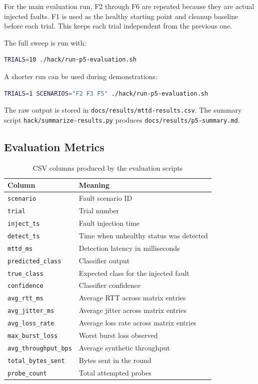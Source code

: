 \documentclass[11pt,a4paper]{article}
\newcommand{\code}[1]{\texttt{#1}}
\begin{document}
For the main evaluation run, F2 through F6 are repeated because they are actual injected faults. F1 is used as the healthy starting point and cleanup baseline before each trial. This keeps each trial independent from the previous one.

The full sweep is run with:

\begin{lstlisting}[language=bash]
TRIALS=10 ./hack/run-p5-evaluation.sh
\end{lstlisting}

A shorter run can be used during demonstrations:

\begin{lstlisting}[language=bash]
TRIALS=1 SCENARIOS="F2 F3 F5" ./hack/run-p5-evaluation.sh
\end{lstlisting}

The raw output is stored in \code{docs/results/mttd-results.csv}. The summary script \code{hack/summarize-results.py} produces \code{docs/results/p5-summary.md}.

\subsection{Evaluation Metrics}

\begin{table}[h]
\centering
\caption{CSV columns produced by the evaluation scripts}
\begin{tabularx}{\textwidth}{@{}lY@{}}
\toprule
\textbf{Column} & \textbf{Meaning} \\
\midrule
\code{scenario} & Fault scenario ID \\
\code{trial} & Trial number \\
\code{inject\_ts} & Fault injection time \\
\code{detect\_ts} & Time when unhealthy status was detected \\
\code{mttd\_ms} & Detection latency in milliseconds \\
\code{predicted\_class} & Classifier output \\
\code{true\_class} & Expected class for the injected fault \\
\code{confidence} & Classifier confidence \\
\code{avg\_rtt\_ms} & Average RTT across matrix entries \\
\code{avg\_jitter\_ms} & Average jitter across matrix entries \\
\code{avg\_loss\_rate} & Average loss rate across matrix entries \\
\code{max\_burst\_loss} & Worst burst loss observed \\
\code{avg\_throughput\_bps} & Average synthetic throughput \\
\code{total\_bytes\_sent} & Bytes sent in the round \\
\code{probe\_count} & Total attempted probes \\
\bottomrule
\end{tabularx}
\end{table}
\end{document}
